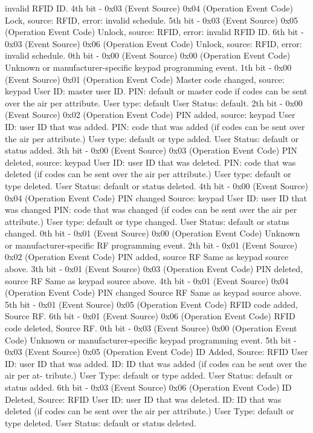 invalid RFID ID. 4th bit - 0x03 (Event Source) 0x04 (Operation Event Code)  Lock, source: RFID, error: invalid schedule. 5th bit - 0x03 (Event Source) 0x05 (Operation Event Code)  Unlock, source: RFID, error: invalid RFID ID. 6th bit - 0x03 (Event Source) 0x06 (Operation Event Code)  Unlock, source: RFID, error: invalid schedule. 0th bit - 0x00 (Event Source) 0x00 (Operation Event Code)  Unknown or manufacturer-specific keypad programming event. 1th bit - 0x00 (Event Source) 0x01 (Operation Event Code)  Master code changed, source: keypad User ID: master user ID. PIN: default or master code if codes can be sent over the air per attribute. User type: default User Status: default. 2th bit - 0x00 (Event Source) 0x02 (Operation Event Code)  PIN added, source: keypad User ID: user ID that was added. PIN: code that was added (if codes can be sent over the air per attribute.) User type: default or type added. User Status: default or status added. 3th bit - 0x00 (Event Source) 0x03 (Operation Event Code)  PIN deleted, source: keypad User ID: user ID that was deleted. PIN: code that was deleted (if codes can be sent over the air per attribute.) User type: default or type deleted. User Status: default or status deleted. 4th bit - 0x00 (Event Source) 0x04 (Operation Event Code)  PIN changed Source: keypad User ID: user ID that was changed PIN: code that was changed (if codes can be sent over the air per attribute.) User type: default or type changed. User Status: default or status changed. 0th bit - 0x01 (Event Source) 0x00 (Operation Event Code)  Unknown or manufacturer-specific RF programming event. 2th bit - 0x01 (Event Source) 0x02 (Operation Event Code)  PIN added, source RF Same as keypad source above. 3th bit - 0x01 (Event Source) 0x03 (Operation Event Code)  PIN deleted, source RF Same as keypad source above. 4th bit - 0x01 (Event Source) 0x04 (Operation Event Code)  PIN changed Source RF Same as keypad source above. 5th bit - 0x01 (Event Source) 0x05 (Operation Event Code)  RFID code added, Source RF. 6th bit - 0x01 (Event Source) 0x06 (Operation Event Code)  RFID code deleted, Source RF. 0th bit - 0x03 (Event Source) 0x00 (Operation Event Code)  Unknown or manufacturer-specific keypad programming event. 5th bit - 0x03 (Event Source) 0x05 (Operation Event Code)  ID Added, Source: RFID User ID: user ID that was added. ID: ID that was added (if codes can be sent over the air per at- tribute.) User Type: default or type added. User Status: default or status added. 6th bit - 0x03 (Event Source) 0x06 (Operation Event Code)  ID Deleted, Source: RFID User ID: user ID that was deleted. ID: ID that was deleted (if codes can be sent over the air per attribute.) User Type: default or type deleted. User Status: default or status deleted.
\newline

